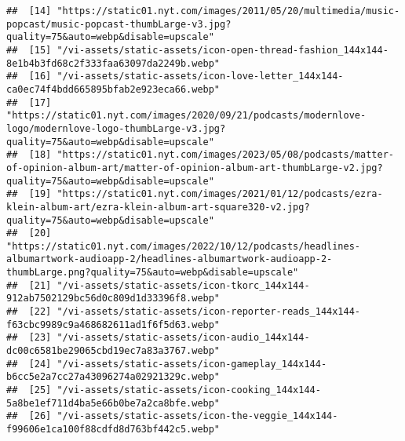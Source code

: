 \documentclass[
]{article}
\begin{document}
\begin{verbatim}
##  [14] "https://static01.nyt.com/images/2011/05/20/multimedia/music-popcast/music-popcast-thumbLarge-v3.jpg?quality=75&auto=webp&disable=upscale"                                                            
##  [15] "/vi-assets/static-assets/icon-open-thread-fashion_144x144-8e1b4b3fd68c2f333faa63097da2249b.webp"                                                                                                     
##  [16] "/vi-assets/static-assets/icon-love-letter_144x144-ca0ec74f4bdd665895bfab2e923eca66.webp"                                                                                                             
##  [17] "https://static01.nyt.com/images/2020/09/21/podcasts/modernlove-logo/modernlove-logo-thumbLarge-v3.jpg?quality=75&auto=webp&disable=upscale"                                                          
##  [18] "https://static01.nyt.com/images/2023/05/08/podcasts/matter-of-opinion-album-art/matter-of-opinion-album-art-thumbLarge-v2.jpg?quality=75&auto=webp&disable=upscale"                                  
##  [19] "https://static01.nyt.com/images/2021/01/12/podcasts/ezra-klein-album-art/ezra-klein-album-art-square320-v2.jpg?quality=75&auto=webp&disable=upscale"                                                 
##  [20] "https://static01.nyt.com/images/2022/10/12/podcasts/headlines-albumartwork-audioapp-2/headlines-albumartwork-audioapp-2-thumbLarge.png?quality=75&auto=webp&disable=upscale"                         
##  [21] "/vi-assets/static-assets/icon-tkorc_144x144-912ab7502129bc56d0c809d1d33396f8.webp"                                                                                                                   
##  [22] "/vi-assets/static-assets/icon-reporter-reads_144x144-f63cbc9989c9a468682611ad1f6f5d63.webp"                                                                                                          
##  [23] "/vi-assets/static-assets/icon-audio_144x144-dc00c6581be29065cbd19ec7a83a3767.webp"                                                                                                                   
##  [24] "/vi-assets/static-assets/icon-gameplay_144x144-b6cc5e2a7cc27a43096274a02921329c.webp"                                                                                                                
##  [25] "/vi-assets/static-assets/icon-cooking_144x144-5a8be1ef711d4ba5e66b0be7a2ca8bfe.webp"                                                                                                                 
##  [26] "/vi-assets/static-assets/icon-the-veggie_144x144-f99606e1ca100f88cdfd8d763bf442c5.webp"                                                                                                              

\end{verbatim}
\end{document}
